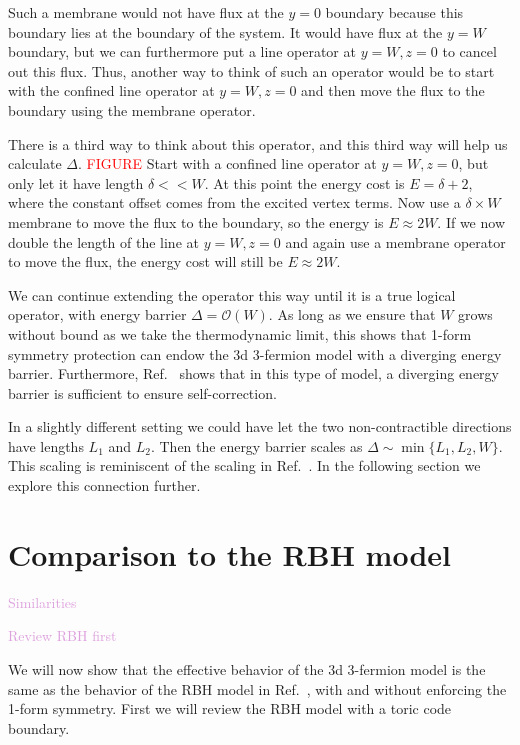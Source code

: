 \documentclass[twocolumn, longbibliography]{revtex4-2}
\newcommand{\note}[1]{\textcolor{red}{#1}}
\newcommand{\outline}[1]{\textcolor{Plum}{#1}}
\begin{document}
Such a membrane would not have flux at the $y=0$ boundary because this boundary lies at the boundary of the system. It would have flux at the $y=W$ boundary, but we can furthermore put a line operator at $y=W, z=0$ to cancel out this flux. Thus, another way to think of such an operator would be to start with the confined line operator at $y=W, z=0$ and then move the flux to the boundary using the membrane operator. 
	
There is a third way to think about this operator, and this third way will help us calculate $\Delta$. \note{FIGURE} Start with a confined line operator at $y=W, z=0$, but only let it have length $\delta<<W$. At this point the energy cost is $E=\delta+2$, where the constant offset comes from the excited vertex terms. Now use a $\delta\times W$ membrane to move the flux to the boundary, so the energy is $E\approx 2W$. If we now double the length of the line at $y=W,z=0$ and again use a membrane operator to move the flux, the energy cost will still be $E\approx 2W$. 
	
We can continue extending the operator this way until it is a true logical operator, with energy barrier $\Delta=\mathcal{O}(W)$. As long as we ensure that $W$ grows without bound as we take the thermodynamic limit, this shows that 1-form symmetry protection can endow the 3d 3-fermion model with a diverging energy barrier. Furthermore, Ref.~\cite{RobertsBartlett} shows that in this type of model, a diverging energy barrier is sufficient to ensure self-correction.
	
In a slightly different setting we could have let the two non-contractible directions have lengths $L_1$ and $L_2$. Then the energy barrier scales as $\Delta\sim \min\{L_1,L_2,W\}$. This scaling is reminiscent of the scaling in Ref.~\cite{RobertsBartlett}. In the following section we explore this connection further.
	
\section{Comparison to the RBH model}
	
\outline{Similarities}
	
\outline{Review RBH first}
	
We will now show that the effective behavior of the 3d 3-fermion model is the same as the behavior of the RBH model in Ref.~\cite{RobertsBartlett}, with and without enforcing the 1-form symmetry. First we will review the RBH model with a toric code boundary. 
	
\end{document}
